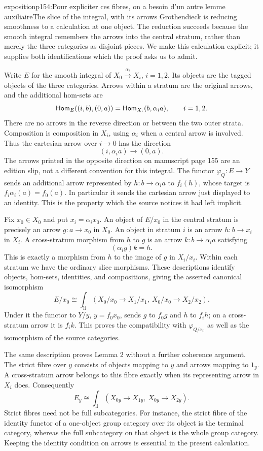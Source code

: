 \begin{dcomment}{exposition}{p154:Pour expliciter ces fibres, on a besoin d'un autre lemme auxiliaire}{The slice of the integral, with its arrows}
Grothendieck is reducing smoothness to a calculation at one object. The reduction succeeds because the smooth integral remembers the arrows into the central stratum, rather than merely the three categories as disjoint pieces. We make this calculation explicit; it supplies both identifications which the proof asks us to admit.

Write $E$ for the smooth integral of $X_0\xrightarrow{\alpha_i}X_i$, $i=1,2$. Its objects are the tagged objects of the three categories. Arrows within a stratum are the original arrows, and the additional hom-sets are
\[
 \mathsf{Hom}_E((i,b),(0,a))=\mathsf{Hom}_{X_i}(b,\alpha_i a),\qquad i=1,2.
\]
There are no arrows in the reverse direction or between the two outer strata. Composition is composition in $X_i$, using $\alpha_i$ when a central arrow is involved. Thus the cartesian arrow over $i\to0$ has the direction
\[
 (i,\alpha_i a)\longrightarrow(0,a).
\]
The arrows printed in the opposite direction on manuscript page 155 are an edition slip, not a different convention for this integral. The functor $\varphi_Q:E\to Y$ sends an additional arrow represented by $h:b\to\alpha_i a$ to $f_i(h)$, whose target is $f_i\alpha_i(a)=f_0(a)$. In particular it sends the cartesian arrow just displayed to an identity. This is the property which the source notices it had left implicit.

Fix $x_0\in X_0$ and put $x_i=\alpha_i x_0$. An object of $E/x_0$ in the central stratum is precisely an arrow $g:a\to x_0$ in $X_0$. An object in stratum $i$ is an arrow $h:b\to x_i$ in $X_i$. A cross-stratum morphism from $h$ to $g$ is an arrow $k:b\to\alpha_i a$ satisfying
\[
       (\alpha_i g)k=h.
\]
This is exactly a morphism from $h$ to the image of $g$ in $X_i/x_i$. Within each stratum we have the ordinary slice morphisms. These descriptions identify objects, hom-sets, identities, and compositions, giving the asserted canonical isomorphism
\[
 E/x_0\cong\int_{\mathrm{li}}
       (X_0/x_0\longrightarrow X_1/x_1,\ X_0/x_0\longrightarrow X_2/x_2).
\]
Under it the functor to $Y/y$, $y=f_0x_0$, sends $g$ to $f_0g$ and $h$ to $f_i h$; on a cross-stratum arrow it is $f_i k$. This proves the compatibility with $\varphi_{Q/x_0}$ as well as the isomorphism of the source categories.

The same description proves Lemma 2 without a further coherence argument. The strict fibre over $y$ consists of objects mapping to $y$ and arrows mapping to $1_y$. A cross-stratum arrow belongs to this fibre exactly when its representing arrow in $X_i$ does. Consequently
\[
 E_y\cong\int_{\mathrm{li}}(X_{0y}\longrightarrow X_{1y},\ X_{0y}\longrightarrow X_{2y}).
\]
Strict fibres need not be full subcategories. For instance, the strict fibre of the identity functor of a one-object group category over its object is the terminal category, whereas the full subcategory on that object is the whole group category. Keeping the identity condition on arrows is essential in the present calculation.


\end{dcomment}
